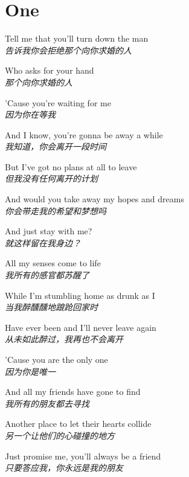 \section{One}

\thispagestyle{empty}


\begin{spacing}{1.5}
\begin{flushleft}
Tell me that you'll turn down the man\\
\textit{告诉我你会拒绝那个向你求婚的人}\lyricspace

Who asks for your hand\\
\textit{那个向你求婚的人}\lyricspace

'Cause you're waiting for me\\
\textit{因为你在等我}\lyricspace

And I know, you're gonna be away a while\\
\textit{我知道，你会离开一段时间}\lyricspace

But I've got no plans at all to leave\\
\textit{但我没有任何离开的计划}\lyricspace

And would you take away my hopes and dreams\\
\textit{你会带走我的希望和梦想吗}\lyricspace

And just stay with me?\\
\textit{就这样留在我身边？}\lyricspace

All my senses come to life\\
\textit{我所有的感官都苏醒了}\lyricspace

While I'm stumbling home as drunk as I\\
\textit{当我醉醺醺地踉跄回家时}\lyricspace

Have ever been and I'll never leave again\\
\textit{从未如此醉过，我再也不会离开}\lyricspace

'Cause you are the only one\\
\textit{因为你是唯一}\lyricspace

And all my friends have gone to find\\
\textit{我所有的朋友都去寻找}\lyricspace

Another place to let their hearts collide\\
\textit{另一个让他们的心碰撞的地方}\lyricspace

Just promise me, you'll always be a friend\\
\textit{只要答应我，你永远是我的朋友}\lyricspace


\end{flushleft}
\end{spacing}
